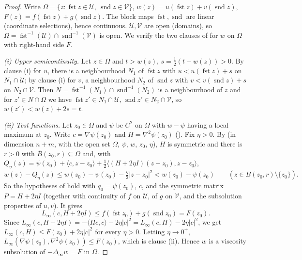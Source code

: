 \begin{proof}
Write $\Omega=\{z:\operatorname{fst}z\in\mathcal U,\ \operatorname{snd}z\in\mathcal V\}$, $w(z)=u(\operatorname{fst}z)+v(\operatorname{snd}z)$, $F(z)=f(\operatorname{fst}z)+g(\operatorname{snd}z)$. The block maps $\operatorname{fst},\operatorname{snd}$ are linear (coordinate selections), hence continuous. $\mathcal U,\mathcal V$ are open (domains), so $\Omega=\operatorname{fst}^{-1}(\mathcal U)\cap\operatorname{snd}^{-1}(\mathcal V)$ is open. We verify the two clauses of  for $w$ on $\Omega$ with right-hand side $F$.

\emph{(i) Upper semicontinuity.} Let $z\in\Omega$ and $t>w(z)$, $s=\frac12(t-w(z))>0$. By clause (i) for $u$, there is a neighbourhood $N_1$ of $\operatorname{fst}z$ with $u<u(\operatorname{fst}z)+s$ on $N_1\cap\mathcal U$; by clause (i) for $v$, a neighbourhood $N_2$ of $\operatorname{snd}z$ with $v<v(\operatorname{snd}z)+s$ on $N_2\cap\mathcal V$. Then $N=\operatorname{fst}^{-1}(N_1)\cap\operatorname{snd}^{-1}(N_2)$ is a neighbourhood of $z$ and for $z'\in N\cap\Omega$ we have $\operatorname{fst}z'\in N_1\cap\mathcal U$, $\operatorname{snd}z'\in N_2\cap\mathcal V$, so $w(z')<w(z)+2s=t$.

\emph{(ii) Test functions.} Let $z_0\in\Omega$ and $\psi$ be $C^2$ on $\Omega$ with $w-\psi$ having a local maximum at $z_0$. Write $c=\nabla\psi(z_0)$ and $H=\nabla^2\psi(z_0)$ (). Fix $\eta>0$. By  (in dimension $n+m$, with the open set $\Omega$, $\psi$, $w$, $z_0$, $\eta$), $H$ is symmetric and there is $r>0$ with $\overline B(z_0,r)\subseteq\Omega$ and, with $Q_\eta(z)=\psi(z_0)+\langle c,z-z_0\rangle+\frac12\langle(H+2\eta I)(z-z_0),z-z_0\rangle$,
\[
w(z)-Q_\eta(z)\le w(z_0)-\psi(z_0)-\tfrac\eta2|z-z_0|^2<w(z_0)-\psi(z_0)\qquad(z\in\overline B(z_0,r)\setminus\{z_0\}).
\]
So the hypotheses of  hold with $q_0=\psi(z_0)$, $c$, and the symmetric matrix $P=H+2\eta I$ (together with continuity of $f$ on $\mathcal U$, of $g$ on $\mathcal V$, and the subsolution properties of $u,v$). It gives
\[
L_\infty(c,H+2\eta I)\le f(\operatorname{fst}z_0)+g(\operatorname{snd}z_0)=F(z_0).
\]
Since $L_\infty(c,H+2\eta I)=-\langle Hc,c\rangle-2\eta|c|^2=L_\infty(c,H)-2\eta|c|^2$, we get $L_\infty(c,H)\le F(z_0)+2\eta|c|^2$ for every $\eta>0$. Letting $\eta\to0^+$, $L_\infty(\nabla\psi(z_0),\nabla^2\psi(z_0))\le F(z_0)$, which is clause (ii). Hence $w$ is a viscosity subsolution of $-\Delta_\infty w=F$ in $\Omega$.
\end{proof}
